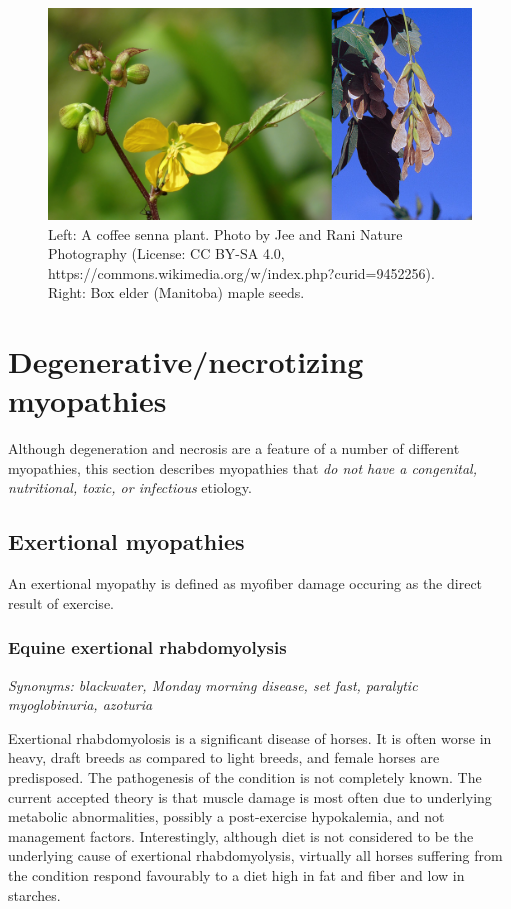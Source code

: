 \documentclass[openany]{report}
\begin{document}
\begin{figure}

{\centering \includegraphics[width=0.6\linewidth]{images/plants} 

}

\caption{Left: A coffee senna plant. Photo by Jee and Rani Nature Photography (License: CC BY-SA 4.0, https://commons.wikimedia.org/w/index.php?curid=9452256). Right: Box elder (Manitoba) maple seeds.}\label{fig:plants}
\end{figure}

\chapter{Degenerative/necrotizing
myopathies}\label{degenerativenecrotizing-myopathies}

Although degeneration and necrosis are a feature of a number of
different myopathies, this section describes myopathies that \emph{do
not have a congenital, nutritional, toxic, or infectious} etiology.

\section{Exertional myopathies}\label{exertional-myopathies}

An exertional myopathy is defined as myofiber damage occuring as the
direct result of exercise.

\hypertarget{equine-exertional-rhabdomyolysis}{\subsection{Equine
exertional rhabdomyolysis}\label{equine-exertional-rhabdomyolysis}}

\emph{Synonyms: blackwater, Monday morning disease, set fast, paralytic
myoglobinuria, azoturia}

Exertional rhabdomyolosis is a significant disease of horses. It is
often worse in heavy, draft breeds as compared to light breeds, and
female horses are predisposed. The pathogenesis of the condition is not
completely known. The current accepted theory is that muscle damage is
most often due to underlying metabolic abnormalities, possibly a
post-exercise hypokalemia, and not management factors. Interestingly,
although diet is not considered to be the underlying cause of exertional
rhabdomyolysis, virtually all horses suffering from the condition
respond favourably to a diet high in fat and fiber and low in starches.
\end{document}
